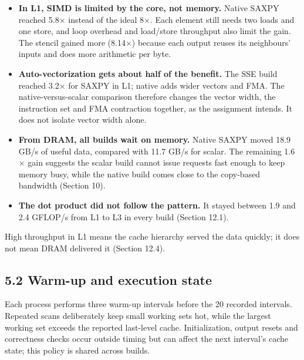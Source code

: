 \documentclass[10pt,letterpaper]{article}
\begin{document}
\begin{itemize}\setlength{\itemsep}{2pt}

\item \textbf{In L1, SIMD is limited by the core, not memory.} Native SAXPY reached 5.8$\times$ instead of the ideal 8$\times$. Each element still needs two loads and one store, and loop overhead and load/store throughput also limit the gain. The stencil gained more (8.14$\times$) because each output reuses its neighbours' inputs and does more arithmetic per byte.

\item \textbf{Auto-vectorization gets about half of the benefit.} The SSE build reached 3.2$\times$ for SAXPY in L1; native adds wider vectors and FMA. The native-versus-scalar comparison therefore changes the vector width, the instruction set and FMA contraction together, as the assignment intends. It does not isolate vector width alone.

\item \textbf{From DRAM, all builds wait on memory.} Native SAXPY moved 18.9 GB/s of useful data, compared with 11.7 GB/s for scalar. The remaining 1.6$\times$ gain suggests the scalar build cannot issue requests fast enough to keep memory busy, while the native build comes close to the copy-based bandwidth (Section 10).

\item \textbf{The dot product did not follow the pattern.} It stayed between 1.9 and 2.4 GFLOP/s from L1 to L3 in every build (Section 12.1).

\end{itemize}

High throughput in L1 means the cache hierarchy served the data quickly; it does not mean DRAM delivered it (Section 12.4).


\subsection*{5.2 Warm-up and execution state}

Each process performs three warm-up intervals before the 20 recorded intervals. Repeated scans deliberately keep small working sets hot, while the largest working set exceeds the reported last-level cache. Initialization, output resets and correctness checks occur outside timing but can affect the next interval's cache state; this policy is shared across builds.
\end{document}
